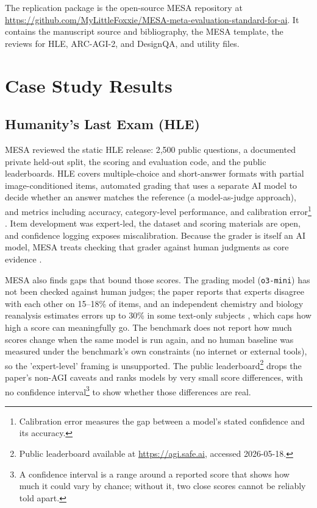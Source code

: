 \documentclass[conference]{IEEEtran}
\begin{document}
        The replication package is the open-source MESA repository at \url{https://github.com/MyLittleFoxxie/MESA-meta-evaluation-standard-for-ai}. It contains the manuscript source and bibliography, the MESA template, the reviews for HLE, ARC-AGI-2, and DesignQA, and utility files.

\section{Case Study Results}

    \subsection{Humanity's Last Exam (HLE)}
    
        MESA reviewed the static HLE release: 2,500 public questions, a documented private held-out split, the scoring and evaluation code, and the public leaderboards. HLE covers multiple-choice and short-answer formats with partial image-conditioned items, automated grading that uses a separate AI model to decide whether an answer matches the reference (a model-as-judge approach), and metrics including accuracy, category-level performance, and calibration error\footnote{Calibration error measures the gap between a model's stated confidence and its accuracy.} \cite{phan_etal_hle_2025}. Item development was expert-led, the dataset and scoring materials are open, and confidence logging exposes miscalibration. Because the grader is itself an AI model, MESA treats checking that grader against human judgments as core evidence \cite{cheng_benchmarking_broken}.

        MESA also finds gaps that bound those scores. The grading model (\texttt{o3-mini}) has not been checked against human judges; the paper reports that experts disagree with each other on 15--18\% of items, and an independent chemistry and biology reanalysis estimates errors up to 30\% in some text-only subjects \cite{skarlinski_futurehouse_hle_2025}, which caps how high a score can meaningfully go. The benchmark does not report how much scores change when the same model is run again, and no human baseline was measured under the benchmark's own constraints (no internet or external tools), so the 'expert-level' framing is unsupported. The public leaderboard\footnote{Public leaderboard available at \url{https://agi.safe.ai}, accessed 2026-05-18.} drops the paper's non-AGI caveats and ranks models by very small score differences, with no confidence interval\footnote{A confidence interval is a range around a reported score that shows how much it could vary by chance; without it, two close scores cannot be reliably told apart.} to show whether those differences are real.
        
\end{document}
